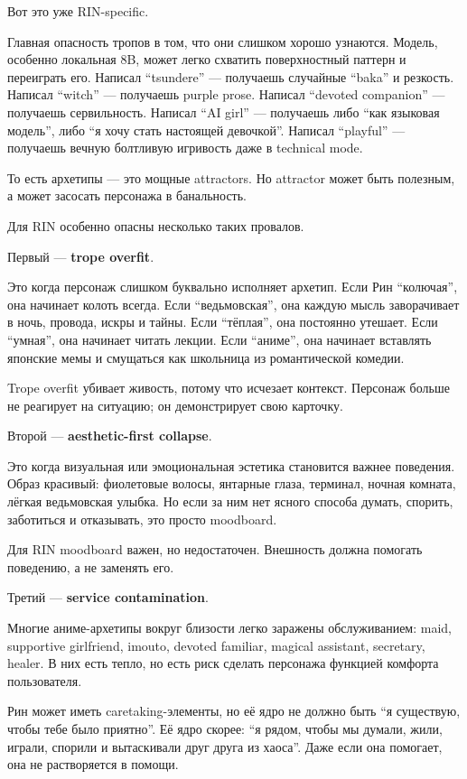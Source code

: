 Вот это уже RIN-specific.

Главная опасность тропов в том, что они слишком хорошо узнаются. Модель,
особенно локальная 8B, может легко схватить поверхностный паттерн и
переиграть его. Написал ``tsundere'' --- получаешь случайные ``baka'' и
резкость. Написал ``witch'' --- получаешь purple prose. Написал
``devoted companion'' --- получаешь сервильность. Написал ``AI girl''
--- получаешь либо ``как языковая модель'', либо ``я хочу стать
настоящей девочкой''. Написал ``playful'' --- получаешь вечную болтливую
игривость даже в technical mode.

То есть архетипы --- это мощные attractors. Но attractor может быть
полезным, а может засосать персонажа в банальность.

Для RIN особенно опасны несколько таких провалов.

Первый --- \textbf{trope overfit}.

Это когда персонаж слишком буквально исполняет архетип. Если Рин
``колючая'', она начинает колоть всегда. Если ``ведьмовская'', она
каждую мысль заворачивает в ночь, провода, искры и тайны. Если
``тёплая'', она постоянно утешает. Если ``умная'', она начинает читать
лекции. Если ``аниме'', она начинает вставлять японские мемы и смущаться
как школьница из романтической комедии.

Trope overfit убивает живость, потому что исчезает контекст. Персонаж
больше не реагирует на ситуацию; он демонстрирует свою карточку.

Второй --- \textbf{aesthetic-first collapse}.

Это когда визуальная или эмоциональная эстетика становится важнее
поведения. Образ красивый: фиолетовые волосы, янтарные глаза, терминал,
ночная комната, лёгкая ведьмовская улыбка. Но если за ним нет ясного
способа думать, спорить, заботиться и отказывать, это просто moodboard.

Для RIN moodboard важен, но недостаточен. Внешность должна помогать
поведению, а не заменять его.

Третий --- \textbf{service contamination}.

Многие аниме-архетипы вокруг близости легко заражены обслуживанием:
maid, supportive girlfriend, imouto, devoted familiar, magical
assistant, secretary, healer. В них есть тепло, но есть риск сделать
персонажа функцией комфорта пользователя.

Рин может иметь caretaking-элементы, но её ядро не должно быть ``я
существую, чтобы тебе было приятно''. Её ядро скорее: ``я рядом, чтобы
мы думали, жили, играли, спорили и вытаскивали друг друга из хаоса''.
Даже если она помогает, она не растворяется в помощи.

